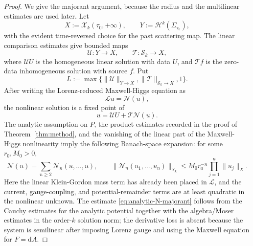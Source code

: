 \documentclass[11pt]{article}
\numberwithin{equation}{section}
\theoremstyle{plain}
\theoremstyle{definition}
\theoremstyle{remark}
\newcommand{\dd}{\mathrm{d}}
\begin{document}
\begin{proof}

We give the majorant argument, because the radius and the multilinear estimates are used later.  Let
\[
X:=\mathcal X_k(\tau_0,+\infty),\qquad Y:=\mathcal H^k(\Sigma_{\tau_0}),
\]
with the evident time-reversed choice for the past scattering map.  The linear comparison estimates give bounded maps
\[
\mathcal U:Y\to X,
\qquad
\mathcal T:\mathcal S_k\to X,
\]
where \(\mathcal U U\) is the homogeneous linear solution with data \(U\), and \(\mathcal T f\) is the zero-data inhomogeneous solution with source \(f\).  Put
\[
L:=\max\{\|\mathcal U\|_{Y\to X},\|\mathcal T\|_{\mathcal S_k\to X},1\}.
\]
After writing the Lorenz-reduced Maxwell-Higgs equation as
\[
\mathcal L u=\mathcal N(u),
\]
the nonlinear solution is a fixed point of
\begin{equation}\label{eq:analytic-fixed-point}
 u=\mathcal U U+\mathcal T\mathcal N(u).
\end{equation}
The analytic assumption on \(P\), the product estimates recorded in the proof of Theorem~\ref{thm:method}, and the vanishing of the linear part of the Maxwell-Higgs nonlinearity imply the following Banach-space expansion: for some \(r_0,M_0>0\),
\begin{equation}\label{eq:analytic-N-majorant}
 \mathcal N(u)=\sum_{n\ge2}\mathcal N_n(u,\ldots,u),
 \qquad
 \|\mathcal N_n(u_1,\ldots,u_n)\|_{\mathcal S_k}
 \le M_0 r_0^{-n}\prod_{j=1}^n\|u_j\|_X.
\end{equation}
Here the linear Klein-Gordon mass term has already been placed in \(\mathcal L\), and the current, gauge-coupling, and potential-remainder terms are at least quadratic in the nonlinear unknown.  The estimate \eqref{eq:analytic-N-majorant} follows from the Cauchy estimates for the analytic potential together with the algebra/Moser estimates in the order-\(k\) solution norm; the derivative loss is absent because the system is semilinear after imposing Lorenz gauge and using the Maxwell equation for \(F=\dd A\).


\end{proof}
\end{document}
